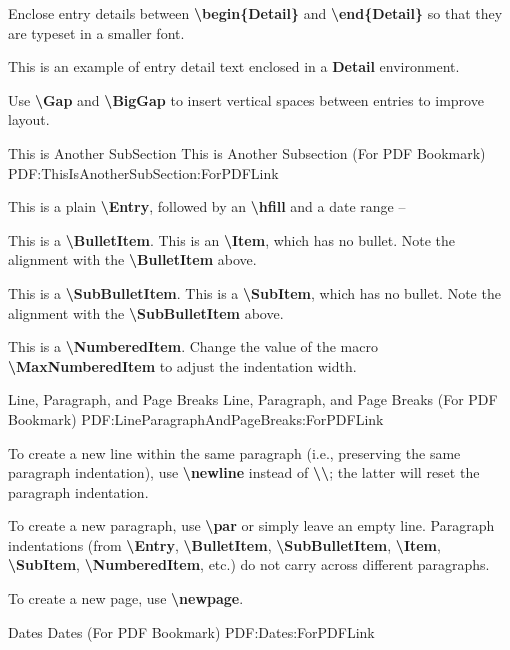 \documentclass[letterpaper,MMMyyyy,nonstopmode]{simpleresumecv}
\newcommand{\Code}[1]{\mbox{\textbf{#1}}}
\newcommand{\CodeCommand}[1]{\mbox{\textbf{\textbackslash{#1}}}}
\begin{document}
\begin{Body}
{\Gap
\BulletItem
Enclose entry details between
\CodeCommand{begin\{Detail\}} and
\CodeCommand{end\{Detail\}}
so that they are typeset in a smaller font.
\begin{Detail}
\Item
This is an example of entry detail text enclosed in a \Code{Detail} environment.
\end{Detail}

\Gap
\BulletItem
Use \CodeCommand{Gap} and \CodeCommand{BigGap} to insert vertical spaces between entries to improve layout.

\BigGap
\SubSection
{This is Another SubSection}
{This is Another Subsection (For PDF Bookmark)}
{PDF:ThisIsAnotherSubSection:ForPDFLink}

\Gap
\Entry
This is a plain \CodeCommand{Entry},
followed by an \CodeCommand{hfill} and a date range
\hfill
{} --

\Gap
\BulletItem
This is a \CodeCommand{BulletItem}.
\Item
This is an \CodeCommand{Item}, which has no bullet.
Note the alignment with the \CodeCommand{BulletItem} above.

\Gap
\SubBulletItem
This is a \CodeCommand{SubBulletItem}.
\SubItem
This is a \CodeCommand{SubItem}, which has no bullet.
Note the alignment with the \CodeCommand{SubBulletItem} above.

\Gap
\NumberedItem{[42]}
This is a \CodeCommand{NumberedItem}.
Change the value of the macro \CodeCommand{MaxNumberedItem} to adjust the indentation width.

\BigGap
\SubSection
{Line, Paragraph, and Page Breaks}
{Line, Paragraph, and Page Breaks (For PDF Bookmark)}
{PDF:LineParagraphAndPageBreaks:ForPDFLink}

\Gap
\BulletItem
To create a new line within the same paragraph (i.e., preserving the same paragraph indentation), use \CodeCommand{newline} instead of \CodeCommand{\textbackslash};
the latter will reset the paragraph indentation.

\Gap
\BulletItem
To create a new paragraph, use \CodeCommand{par} or simply leave an empty line.
Paragraph indentations (from
\CodeCommand{Entry},
\CodeCommand{BulletItem},
\CodeCommand{SubBulletItem},
\CodeCommand{Item},
\CodeCommand{SubItem},
\CodeCommand{NumberedItem},
etc.) do not carry across different paragraphs.

\Gap
\BulletItem
To create a new page, use \CodeCommand{newpage}.

\BigGap
\SubSection
{Dates}
{Dates (For PDF Bookmark)}
{PDF:Dates:ForPDFLink}

}
\end{Body}
\end{document}
